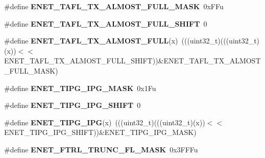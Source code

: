 \begin{DoxyCompactItemize}
\item 
\#define {\bfseries E\+N\+E\+T\+\_\+\+T\+A\+F\+L\+\_\+\+T\+X\+\_\+\+A\+L\+M\+O\+S\+T\+\_\+\+F\+U\+L\+L\+\_\+\+M\+A\+SK}~0x\+F\+Fu\hypertarget{group__ENET__Register__Masks_gae28ae12fc0e108d7d8d82efce1d3d016}{}\label{group__ENET__Register__Masks_gae28ae12fc0e108d7d8d82efce1d3d016}

\item 
\#define {\bfseries E\+N\+E\+T\+\_\+\+T\+A\+F\+L\+\_\+\+T\+X\+\_\+\+A\+L\+M\+O\+S\+T\+\_\+\+F\+U\+L\+L\+\_\+\+S\+H\+I\+FT}~0\hypertarget{group__ENET__Register__Masks_ga8667ed29a0d85d764598142ed22744c9}{}\label{group__ENET__Register__Masks_ga8667ed29a0d85d764598142ed22744c9}

\item 
\#define {\bfseries E\+N\+E\+T\+\_\+\+T\+A\+F\+L\+\_\+\+T\+X\+\_\+\+A\+L\+M\+O\+S\+T\+\_\+\+F\+U\+LL}(x)~(((uint32\+\_\+t)(((uint32\+\_\+t)(x))$<$$<$E\+N\+E\+T\+\_\+\+T\+A\+F\+L\+\_\+\+T\+X\+\_\+\+A\+L\+M\+O\+S\+T\+\_\+\+F\+U\+L\+L\+\_\+\+S\+H\+I\+FT))\&E\+N\+E\+T\+\_\+\+T\+A\+F\+L\+\_\+\+T\+X\+\_\+\+A\+L\+M\+O\+S\+T\+\_\+\+F\+U\+L\+L\+\_\+\+M\+A\+SK)\hypertarget{group__ENET__Register__Masks_gae7c579eb1b431bcaa54c840755d9dea0}{}\label{group__ENET__Register__Masks_gae7c579eb1b431bcaa54c840755d9dea0}

\item 
\#define {\bfseries E\+N\+E\+T\+\_\+\+T\+I\+P\+G\+\_\+\+I\+P\+G\+\_\+\+M\+A\+SK}~0x1\+Fu\hypertarget{group__ENET__Register__Masks_ga762834c2d579052c47b81ddf501514e1}{}\label{group__ENET__Register__Masks_ga762834c2d579052c47b81ddf501514e1}

\item 
\#define {\bfseries E\+N\+E\+T\+\_\+\+T\+I\+P\+G\+\_\+\+I\+P\+G\+\_\+\+S\+H\+I\+FT}~0\hypertarget{group__ENET__Register__Masks_gabab61fb9b318b0019d086418cc90f1f7}{}\label{group__ENET__Register__Masks_gabab61fb9b318b0019d086418cc90f1f7}

\item 
\#define {\bfseries E\+N\+E\+T\+\_\+\+T\+I\+P\+G\+\_\+\+I\+PG}(x)~(((uint32\+\_\+t)(((uint32\+\_\+t)(x))$<$$<$E\+N\+E\+T\+\_\+\+T\+I\+P\+G\+\_\+\+I\+P\+G\+\_\+\+S\+H\+I\+FT))\&E\+N\+E\+T\+\_\+\+T\+I\+P\+G\+\_\+\+I\+P\+G\+\_\+\+M\+A\+SK)\hypertarget{group__ENET__Register__Masks_ga7414200ac00eb81e47fa4f8edf6dbc68}{}\label{group__ENET__Register__Masks_ga7414200ac00eb81e47fa4f8edf6dbc68}

\item 
\#define {\bfseries E\+N\+E\+T\+\_\+\+F\+T\+R\+L\+\_\+\+T\+R\+U\+N\+C\+\_\+\+F\+L\+\_\+\+M\+A\+SK}~0x3\+F\+F\+Fu\hypertarget{group__ENET__Register__Masks_ga05457257c070632d99a2691b0859b4a9}{}\label{group__ENET__Register__Masks_ga05457257c070632d99a2691b0859b4a9}


\end{DoxyCompactItemize}
